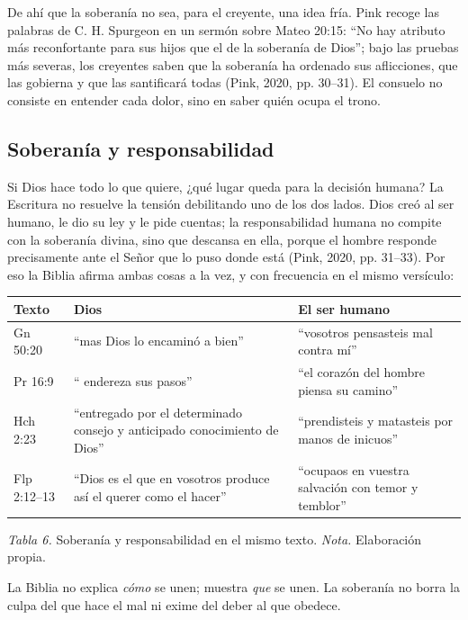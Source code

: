 De ahí que la soberanía no sea, para el creyente, una idea fría. Pink recoge las palabras de C. H. Spurgeon en un sermón sobre Mateo 20:15: ``No hay atributo más reconfortante para sus hijos que el de la soberanía de Dios''; bajo las pruebas más severas, los creyentes saben que la soberanía ha ordenado sus aflicciones, que las gobierna y que las santificará todas (Pink, 2020, pp. 30--31). El consuelo no consiste en entender cada dolor, sino en saber quién ocupa el trono.

\subsection{Soberanía y responsabilidad}
Si Dios hace todo lo que quiere, ¿qué lugar queda para la decisión humana? La Escritura no resuelve la tensión debilitando uno de los dos lados. Dios creó al ser humano, le dio su ley y le pide cuentas; la responsabilidad humana no compite con la soberanía divina, sino que descansa en ella, porque el hombre responde precisamente ante el Señor que lo puso donde está (Pink, 2020, pp. 31--33). Por eso la Biblia afirma ambas cosas a la vez, y con frecuencia en el mismo versículo:

\begin{center}\small\renewcommand{\arraystretch}{1.18}
\begin{tabular}{@{}L{2.2cm}L{5.6cm}L{6.0cm}@{}}
\toprule
\textbf{Texto} & \textbf{Dios} & \textbf{El ser humano} \\ \midrule
Gn 50:20 & ``mas Dios lo encaminó a bien'' & ``vosotros pensasteis mal contra mí'' \\
Pr 16:9 & ``\SENOR{} endereza sus pasos'' & ``el corazón del hombre piensa su camino'' \\
Hch 2:23 & ``entregado por el determinado consejo y anticipado conocimiento de Dios'' & ``prendisteis y matasteis por manos de inicuos'' \\
Flp 2:12--13 & ``Dios es el que en vosotros produce así el querer como el hacer'' & ``ocupaos en vuestra salvación con temor y temblor'' \\
\bottomrule
\end{tabular}\par
{\footnotesize\color{gris}\textit{Tabla 6.} Soberanía y responsabilidad en el mismo texto. \textit{Nota.} Elaboración propia.}
\end{center}

La Biblia no explica \emph{cómo} se unen; muestra \emph{que} se unen. La soberanía no borra la culpa del que hace el mal ni exime del deber al que obedece.

